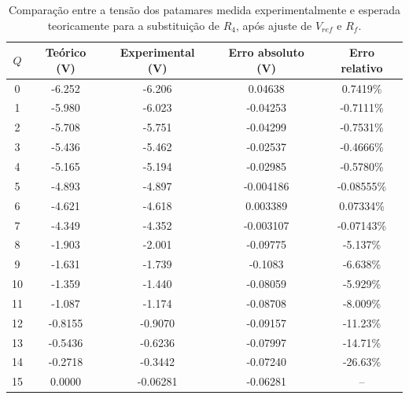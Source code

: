 \documentclass[a4paper, oneside]{article}
\begin{document}
\begin{table}[ht]
	\centering
	\caption{Comparação entre a tensão dos patamares medida experimentalmente e esperada teoricamente para a substituição de $R_4$, após ajuste de $V_{ref}$ e $R_f$.}
	\label{tab:Pat_R4_exp_Aj}
	\begin{tabular}{ccccc}
		$Q$ & Teórico (V) & Experimental (V) & Erro absoluto (V) & Erro relativo\\
		\hline
		0 & -6.252 & -6.206 & 0.04638 & 0.7419\%\\ 
		1 & -5.980 & -6.023 & -0.04253 & -0.7111\%\\ 
		2 & -5.708 & -5.751 & -0.04299 & -0.7531\%\\ 
		3 & -5.436 & -5.462 & -0.02537 & -0.4666\%\\ 
		4 & -5.165 & -5.194 & -0.02985 & -0.5780\%\\ 
		5 & -4.893 & -4.897 & -0.004186 & -0.08555\%\\ 
		6 & -4.621 & -4.618 & 0.003389 & 0.07334\%\\ 
		7 & -4.349 & -4.352 & -0.003107 & -0.07143\%\\ 
		8 & -1.903 & -2.001 & -0.09775 & -5.137\%\\ 
		9 & -1.631 & -1.739 & -0.1083 & -6.638\%\\ 
		10 & -1.359 & -1.440 & -0.08059 & -5.929\%\\ 
		11 & -1.087 & -1.174 & -0.08708 & -8.009\%\\ 
		12 & -0.8155 & -0.9070 & -0.09157 & -11.23\%\\ 
		13 & -0.5436 & -0.6236 & -0.07997 & -14.71\%\\ 
		14 & -0.2718 & -0.3442 & -0.07240 & -26.63\%\\ 
		15 & 0.0000 & -0.06281 & -0.06281 & --\\
	
		
		\hline
	\end{tabular}
\end{table}
\end{document}
